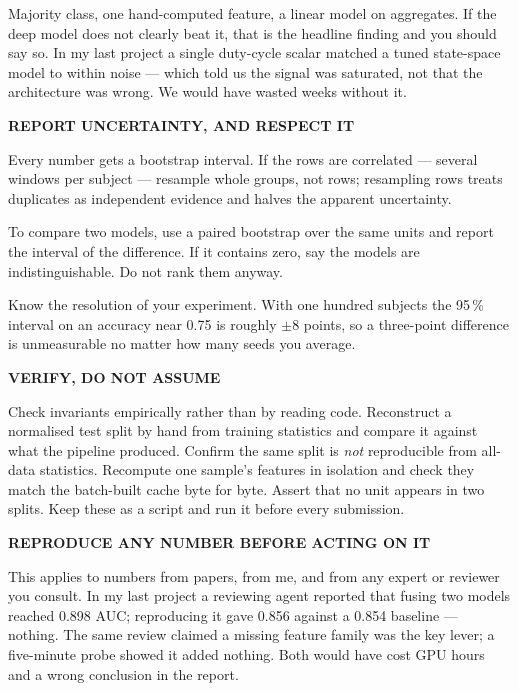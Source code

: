 \documentclass[11pt,a4paper]{article}
\begin{document}
\begin{promptbox}
Majority class, one hand-computed feature, a linear model on aggregates. If the
deep model does not clearly beat it, that is the headline finding and you should
say so. In my last project a single duty-cycle scalar matched a tuned
state-space model to within noise --- which told us the signal was saturated,
not that the architecture was wrong. We would have wasted weeks without it.

\vspace{3pt}\textbf{REPORT UNCERTAINTY, AND RESPECT IT}

Every number gets a bootstrap interval. If the rows are correlated --- several
windows per subject --- resample whole groups, not rows; resampling rows treats
duplicates as independent evidence and halves the apparent uncertainty.

To compare two models, use a paired bootstrap over the same units and report the
interval of the difference. If it contains zero, say the models are
indistinguishable. Do not rank them anyway.

Know the resolution of your experiment. With one hundred subjects the 95\,\%
interval on an accuracy near 0.75 is roughly $\pm 8$ points, so a
three-point difference is unmeasurable no matter how many seeds you average.

\vspace{3pt}\textbf{VERIFY, DO NOT ASSUME}

Check invariants empirically rather than by reading code. Reconstruct a
normalised test split by hand from training statistics and compare it against
what the pipeline produced. Confirm the same split is \emph{not} reproducible
from all-data statistics. Recompute one sample's features in isolation and check
they match the batch-built cache byte for byte. Assert that no unit appears in
two splits. Keep these as a script and run it before every submission.

\vspace{3pt}\textbf{REPRODUCE ANY NUMBER BEFORE ACTING ON IT}

This applies to numbers from papers, from me, and from any expert or reviewer
you consult. In my last project a reviewing agent reported that fusing two
models reached 0.898 AUC; reproducing it gave 0.856 against a 0.854 baseline ---
nothing. The same review claimed a missing feature family was the key lever; a
five-minute probe showed it added nothing. Both would have cost GPU hours and a
wrong conclusion in the report.
\end{promptbox}
\end{document}

